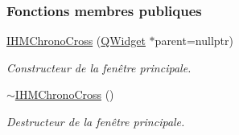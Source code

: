 \subsubsection*{Fonctions membres publiques}
\begin{DoxyCompactItemize}
\item 
\hyperlink{class_i_h_m_chrono_cross_a479fc90733fba3e65fb06aa4a3adc02e}{I\+H\+M\+Chrono\+Cross} (\hyperlink{class_q_widget}{Q\+Widget} $\ast$parent=nullptr)
\begin{DoxyCompactList}\small\item\em Constructeur de la fenêtre principale. \end{DoxyCompactList}\item 
\hyperlink{class_i_h_m_chrono_cross_a312f21e1d150096b3f36ba36476907eb}{$\sim$\+I\+H\+M\+Chrono\+Cross} ()
\begin{DoxyCompactList}\small\item\em Destructeur de la fenêtre principale. \end{DoxyCompactList}\end{DoxyCompactItemize}
